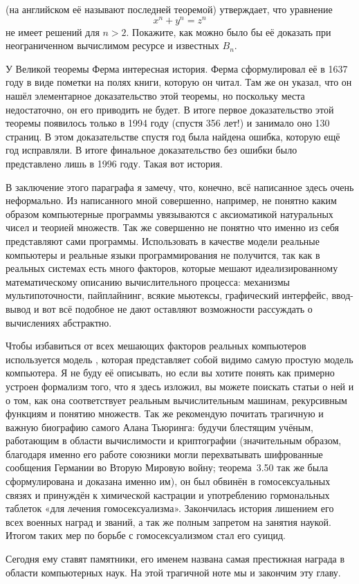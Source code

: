 \begin{exercise}
 (на английском её называют последней теоремой) утверждает, что уравнение
$$x^n + y^n = z^n$$
не имеет решений для $n>2$. Покажите, как можно было бы её доказать при неограниченном вычислимом ресурсе и известных $B_n$.
\end{exercise}

У Великой теоремы Ферма интересная история. Ферма сформулировал её в 1637 году в виде пометки на полях книги, которую он читал. Там же он указал, что он нашёл элементарное доказательство этой теоремы, но поскольку места недостаточно, он его приводить не будет. В итоге первое доказательство этой теоремы появилось только в 1994 году (спустя 356 лет!) и занимало оно 130 страниц. В этом доказательстве спустя год была найдена ошибка, которую ещё год исправляли. В итоге финальное доказательство без ошибки было представлено лишь в 1996 году. Такая вот история.

В заключение этого параграфа я замечу, что, конечно, всё написанное здесь очень неформально. Из написанного мной совершенно, например, не понятно каким образом компьютерные программы увязываются с аксиоматикой натуральных чисел и теорией множеств. Так же совершенно не понятно что именно из себя представляют сами программы. Использовать в качестве модели реальные компьютеры и реальные языки программирования не получится, так как в реальных системах есть много факторов, которые мешают идеализированному математическому описанию вычислительного процесса: механизмы мультипоточности, пайплайнинг, всякие мьютексы, графический интерфейс, ввод-вывод и вот всё подобное не дают оставляют возможности рассуждать о вычислениях абстрактно.

Чтобы избавиться от всех мешающих факторов реальных компьютеров используется модель , которая представляет собой видимо самую простую модель компьютера. Я не буду её описывать, но если вы хотите понять как примерно устроен формализм того, что я здесь изложил, вы можете поискать статьи о ней и о том, как она соответствует реальным вычислительным машинам, рекурсивным функциям и понятию множеств. Так же рекомендую почитать трагичную и важную биографию самого Алана Тьюринга: будучи блестящим учёным, работающим в области вычислимости и криптографии (значительным образом, благодаря именно его работе союзники могли перехватывать шифрованные сообщения Германии во Вторую Мировую войну; теорема~3.50 так же была сформулирована и доказана именно им), он был обвинён в гомосексуальных связях и принуждён к химической кастрации и употреблению гормональных таблеток «для лечения гомосексуализма». Закончилась история лишением его всех военных наград и званий, а так же полным запретом на занятия наукой. Итогом таких мер по борьбе с гомосексуализмом стал его суицид.

Сегодня ему ставят памятники, его именем названа самая престижная награда в области компьютерных наук. На этой трагичной ноте мы и закончим эту главу.
